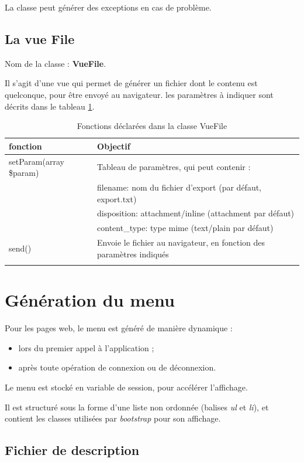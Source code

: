 La classe peut générer des exceptions en cas de problème.

\section{La vue File}
Nom de la classe : \textbf{VueFile}.

Il s'agit d'une vue qui permet de générer un fichier dont le contenu est quelconque, pour être envoyé au navigateur. les paramètres à indiquer sont décrits dans le tableau \ref{tab:vuefile}.

\begin{longtable}{|p{5cm}|p{8cm}|}
\hline
\textbf{fonction} & \textbf{Objectif} \\
\hline
\endhead
\hline\endfoot\endlastfoot
setParam(array \$param)& Tableau de paramètres, qui peut contenir :\\
 & filename: nom du fichier d'export (par défaut, export.txt)\\
 & disposition: attachment/inline (attachment par défaut)\\
 & content\_type: type mime (text/plain par défaut) \\

send() & Envoie le fichier au navigateur, en fonction des paramètres indiqués \\
\hline
\caption{Fonctions déclarées dans la classe VueFile}\label{tab:vuefile}
\end{longtable}



\chapter{Génération du menu}
Pour les pages web, le menu est généré de manière dynamique :
\begin{itemize}
\item lors du premier appel à l'application ;
\item après toute opération de connexion ou de déconnexion.
\end{itemize}

Le menu est stocké en variable de session, pour accélérer l'affichage.

Il est structuré sous la forme d'une liste non ordonnée (balises \textit{ul} et \textit{li}), et contient les classes utilisées par \textit{bootstrap} pour son affichage.

\section{Fichier de description}

